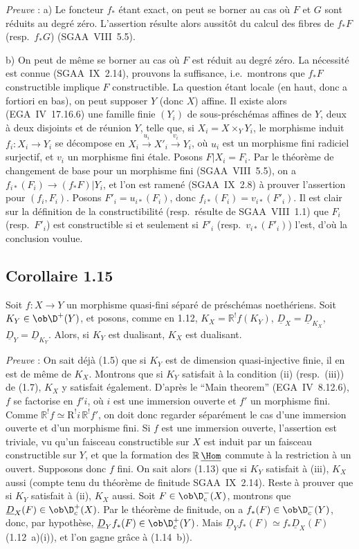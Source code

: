 \emph{Preuve} : a) Le foncteur $f_{*}$ étant exact, on peut se borner au cas où $F$ et $G$ sont réduits au degré zéro. L'assertion résulte alors aussitôt du calcul des fibres de $f_{*}F$ (resp.~$f_{*}G$) (SGAA~VIII~5.5).

b) On peut de même se borner au cas où $F$ est réduit au degré zéro. La nécessité est connue (SGAA~IX~2.14), prouvons la suffisance, i.e.~montrons que $f_{*}F$ constructible implique $F$ constructible. La question étant locale (en haut, donc a fortiori en bas), on peut supposer $Y$ (donc $X$) affine. Il existe alors (EGA~IV~17.16.6) une famille finie $(Y_i)$ de sous-préschémas affines de $Y$, deux à deux disjoints et de réunion $Y$, telle que, si $X_i = X \times_Y Y_i$, le morphisme induit $f_i : X_i \to Y_i$ se décompose en $X_i \xrightarrow{u_i} X'_i \xrightarrow{v_i} Y_i$, où $u_i$ est un morphisme fini radiciel surjectif, et $v_i$ un morphisme fini étale. Posons $F|X_i = F_i$. Par le théorème de changement de base pour un morphisme fini (SGAA~VIII~5.5), on a $f_{i*}(F_i) \to (f_{*}F)|Y_i$, et l'on est ramené (SGAA~IX~2.8) à prouver l'assertion pour $(f_i, F_i)$. Posons $F'_i = u_{i*}(F_i)$, donc $f_{i*}(F_i) = v_{i*}(F'_i)$. Il est clair sur la définition de la constructibilité (resp.~résulte de SGAA~VIII~1.1) que $F_i$ (resp.~$F'_i$) est constructible si et seulement si $F'_i$ (resp.~$v_{i*}(F'_i)$) l'est, d'où la conclusion voulue.

\subsection*{Corollaire 1.15}
Soit $f : X \to Y$ un morphisme quasi-fini séparé de préschémas noethériens. Soit $K_Y \in \ob \D^{+}(Y)$, et posons, comme en 1.12, $K_X = \mathbb{R}^{!}f(K_Y)$, $\underline{D}_X = \underline{D}_{K_X}$, $\underline{D}_Y = \underline{D}_{K_Y}$. Alors, si $K_Y$ est dualisant, $K_X$ est dualisant.

\emph{Preuve} : On sait déjà (1.5) que si $K_Y$ est de dimension quasi-injective finie, il en est de même de $K_X$. Montrons que si $K_Y$ satisfait à la condition (ii) (resp.~(iii)) de (1.7), $K_X$ y satisfait également. D'après le ``Main theorem'' (EGA~IV~8.12.6), $f$ se factorise en $f'i$, où $i$ est une immersion ouverte et $f'$ un morphisme fini. Comme $\mathbb{R}^{!}f \simeq \mathrm{R}^{!}i \, \mathbb{R}^{!}f'$, on doit donc regarder séparément le cas d'une immersion ouverte et d'un morphisme fini. Si $f$ est une immersion ouverte, l'assertion est triviale, vu qu'un faisceau constructible sur $X$ est induit par un faisceau constructible sur $Y$, et que la formation des $\mathbb{R}\,\underline{\Hom}$ commute à la restriction à un ouvert. Supposons donc $f$ fini. On sait alors (1.13) que si $K_Y$ satisfait à (iii), $K_X$ aussi (compte tenu du théorème de finitude SGAA~IX~2.14). Reste à prouver que si $K_Y$ satisfait à (ii), $K_X$ aussi. Soit $F \in \ob \D_c^{-}(X)$, montrons que $\underline{D}_X(F) \in \ob \D_c^{+}(X)$. Par le théorème de finitude, on a $f_{*}(F) \in \ob \D_c^{-}(Y)$, donc, par hypothèse, $\underline{D}_Y f_{*}(F) \in \ob \D_c^{+}(Y)$. Mais $\underline{D}_Y f_{*}(F) \simeq f_{*}\underline{D}_X(F)$ (1.12~a)(i)), et l'on gagne grâce à (1.14~b)).

